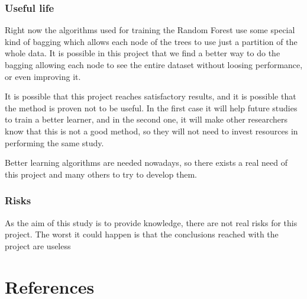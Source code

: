 \documentclass[a4paper]{article}
\begin{document}
            \subsubsection{Useful life}
                Right now the algorithms used for training the Random Forest use some special kind of bagging which allows each node of the trees to use just a partition of the whole data. It is possible in this project that we find a better way to do the bagging allowing each node to see the entire dataset without loosing performance, or even improving it.

                It is possible that this project reaches satisfactory results, and it is possible that the method is proven not to be useful. In the first case it will help future studies to train a better learner, and in the second one, it will make other researchers know that this is not a good method, so they will not need to invest resources in performing the same study.

                Better learning algorithms are needed nowadays, so there exists a real need of this project and many others to try to develop them.

            \subsubsection{Risks}
                As the aim of this study is to provide knowledge, there are not real risks for this project. The worst it could happen is that the conclusions reached with the project are useless

    \section{References}











\printbibliography
\end{document}
